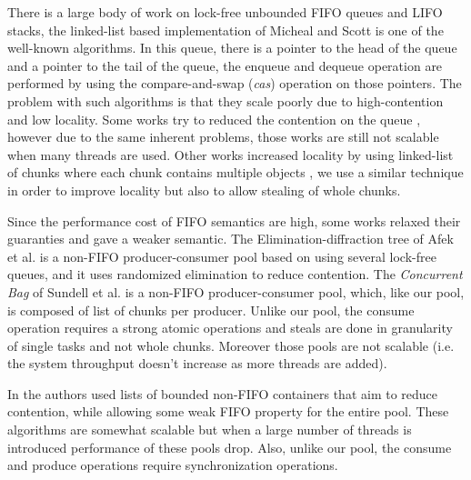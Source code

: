 There is a large body of work on lock-free unbounded FIFO queues and LIFO stacks, the linked-list
based implementation of Micheal and Scott \cite{Michael:1996:SFP:248052.248106} is one of the
well-known algorithms. In this queue, there is a pointer to the head of the queue and a pointer to
the tail of the queue, the enqueue and dequeue operation are performed by using the
compare-and-swap (\emph{cas}) operation on those pointers. The problem with such algorithms is
that they scale poorly due to high-contention and low locality. Some works try to reduced the
contention on the queue \cite{Moir:2005:UEI:1073970.1074013,Hoffman:2007:BQ:1782394.1782423},
however due to the same inherent problems, those works are still not scalable when many threads are
used.  Other works increased locality by using linked-list of chunks where each chunk contains
multiple objects \cite{Gidenstam:2010:CLQ:1940234.1940266,Braginsky:2011:LLL:1946143.1946153}, we
use a similar technique in order to improve locality but also to allow stealing of whole chunks. 

Since the performance cost of FIFO semantics are high, some works relaxed their guaranties and
gave a weaker semantic. The Elimination-diffraction tree of Afek et al.
\cite{Afek:2010:SPP:1885276.1885295} is a non-FIFO producer-consumer pool based on using several
lock-free queues, and it uses randomized elimination to reduce contention. The \emph{Concurrent
Bag} of Sundell et al. \cite{Sundell:2011:LAC:1989493.1989550} is a non-FIFO producer-consumer pool,
which, like our pool, is composed of list of chunks per producer. Unlike our pool, the consume
operation requires a strong atomic operations and steals are done in granularity of single tasks and
not whole chunks. Moreover those pools are not scalable (i.e. the system throughput doesn't increase
as more threads are added).

In \cite{Basin:2011:CST:2075029.2075087,springerlink:10.1007/978-3-642-17653-1_29} the authors
used lists of bounded non-FIFO containers that aim to reduce contention, while allowing some weak
FIFO property for the entire pool. These algorithms are somewhat scalable but when a large number
of threads is introduced performance of these pools drop. Also, unlike our pool, the consume and
produce operations require synchronization operations.

